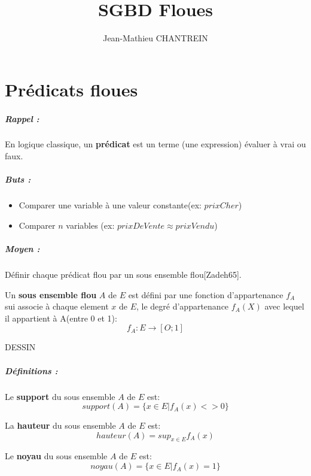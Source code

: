 \documentclass[10pt,a4paper]{report}
\title{SGBD Floues}
\author{Jean-Mathieu CHANTREIN}
\date{}
\begin{document}
\maketitle

\chapter{Prédicats floues}

\paragraph{Rappel :\\}
En logique classique, un \textbf{prédicat} est un terme (une expression) évaluer à vrai ou faux.

\paragraph{Buts :\\}
\begin{itemize}
\item Comparer une variable à une valeur constante(ex: $prixCher$)
\item Comparer $n$ variables (ex: $prixDeVente \approx prixVendu$)
\end{itemize}

\paragraph{Moyen :\\}
Définir chaque prédicat flou par un sous ensemble flou[Zadeh65].


Un \textbf{sous ensemble flou} $A$ de $E$ est défini par une fonction d'appartenance $f_A$ sui associe à chaque element $x$ de $E$, le degré d'appartenance $f_A(X)$ avec lequel il appartient à A(entre 0 et 1):$$f_A:E\rightarrow[O;1]$$

DESSIN

\paragraph{Définitions :\\}

Le \textbf{support} du sous ensemble $A$ de $E$ est:$$support(A)=\{x \in E | f_A(x)<>0 \}$$

La \textbf{hauteur} du sous ensemble $A$ de $E$ est:$$hauteur(A)=sup_{x \in E} f_A(x)$$

Le \textbf{noyau} du sous ensemble $A$ de $E$ est:$$noyau(A)=\{x \in E | f_A(x)=1 \}$$
\end{document}
